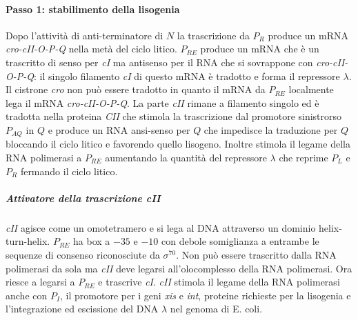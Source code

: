 \paragraph{Passo 1: stabilimento della lisogenia}
Dopo l'attivit\`a di anti-terminatore di $N$ la trascrizione da $P_R$ produce un mRNA \emph{cro-cII-O-P-Q} nella met\`a del ciclo litico. $P_{RE}$ produce un mRNA che \`e un trascritto 
di senso per \emph{cI} ma antisenso per il RNA che si sovrappone con \emph{cro-cII-O-P-Q}: il singolo filamento \emph{cI} di questo mRNA \`e tradotto e forma il repressore $\lambda$. 
Il cistrone \emph{cro} non pu\`o essere tradotto in quanto il mRNA da $P_{RE}$ localmente lega il mRNA \emph{cro-cII-O-P-Q}. La parte \emph{cII} rimane a filamento singolo ed \`e 
tradotta nella proteina \emph{CII} che stimola la trascrizione dal promotore sinistrorso $P_{AQ}$ in $Q$ e produce un RNA ansi-senso per $Q$ che impedisce la traduzione per $Q$ bloccando
il ciclo litico e favorendo quello lisogeno. Inoltre stimola il legame della RNA polimerasi a $P_{RE}$ aumentando la quantit\`a del repressore $\lambda$ che reprime $P_L$ e $P_R$ 
fermando il ciclo litico. 
\subparagraph{Attivatore della trascrizione \emph{cII}}
\emph{cII} agisce come un omotetramero e si lega al DNA attraverso un dominio helix-turn-helix. $P_{RE}$ ha box a $-35$ e $-10$ con debole somiglianza a entrambe le sequenze di consenso 
riconosciute da $\sigma^{70}$. Non pu\`o essere trascritto dalla RNA polimerasi da sola ma \emph{cII} deve legarsi all'olocomplesso della RNA polimerasi. Ora riesce a legarsi a $P_{RE}$
e trascrive \emph{cI}. \emph{cII} stimola il legame della RNA polimerasi anche con $P_I$, il promotore per i geni \emph{xis} e \emph{int}, proteine richieste per la lisogenia e 
l'integrazione ed escissione del DNA $\lambda$ nel genoma di E. coli. 
